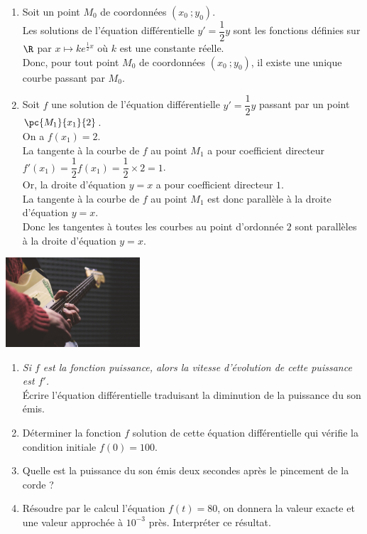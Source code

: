 \documentclass[a4paper,11pt,exos]{nsi} %
\begin{document}
\textcolor{UGLiBlue}{
    \begin{enumerate}
        \item Soit un point $M_0$ de coordonnées $(x_0\ ;y_0)$.\\
        Les solutions de l'équation différentielle $y'=\dfrac{1}{2}y$ sont les fonctions définies sur $\R$ par $x\mapsto ke^{\frac{1}{2}x}$ où $k$ est une constante réelle.\\
        Donc, pour tout point $M_0$ de coordonnées $(x_0\ ;y_0)$, il existe une unique courbe passant par $M_0$.
        \item Soit $f$ une solution de l'équation différentielle $y'=\dfrac{1}{2}y$ passant par un point $\pc{M_1}{x_1}{2}$.\\
        On a $f(x_1)=2$.\\
        La tangente à la courbe de $f$ au point $M_1$ a pour coefficient directeur $f'(x_1)=\dfrac{1}{2}f(x_1)=\dfrac{1}{2}\times 2=1$.\\
        Or, la droite d'équation $y=x$ a pour coefficient directeur $1$.\\
        La tangente à la courbe de $f$ au point $M_1$ est donc parallèle à la droite d'équation $y=x$.\\
        Donc les tangentes à toutes les courbes au point d'ordonnée $2$ sont parallèles à la droite d'équation $y=x$.
    \end{enumerate}
}

\exo{}
{\includegraphics[width=5cm]{guitare.jpg}}
\begin{enumerate}
    \item \faInfo \hspace*{0.1cm} \textit{Si $f$ est la fonction puissance, alors la vitesse d'évolution de cette puissance est $f'$.}\\
    Écrire l'équation différentielle traduisant la diminution de la puissance du son émis.
    \item Déterminer la fonction $f$ solution de cette équation différentielle qui vérifie la condition initiale $f(0)=100$.
    \item Quelle est la puissance du son émis deux secondes après le pincement de la corde ?
    \item Résoudre par le calcul l'équation $f(t)=80$, on donnera la valeur exacte et une valeur approchée à $10^{-3}$ près. Interpréter ce résultat.
\end{enumerate}
\end{document}
